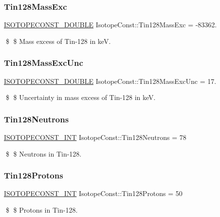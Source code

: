 \subsubsection{\texorpdfstring{Tin128\+Mass\+Exc}{Tin128MassExc}}
{\footnotesize\ttfamily \mbox{\hyperlink{group___isotope_const-_macros_ga8f45a7272ce02c0b4c65c44636ed719a}{I\+S\+O\+T\+O\+P\+E\+C\+O\+N\+S\+T\+\_\+\+D\+O\+U\+B\+LE}} Isotope\+Const\+::\+Tin128\+Mass\+Exc = -\/83362.}

\$ \$ Mass excess of Tin-\/128 in keV. \mbox{\label{group___isotope_const-_tin-_sn128_gaa0fb758383b0a115f6d10980572f7d77}} 
\subsubsection{\texorpdfstring{Tin128\+Mass\+Exc\+Unc}{Tin128MassExcUnc}}
{\footnotesize\ttfamily \mbox{\hyperlink{group___isotope_const-_macros_ga8f45a7272ce02c0b4c65c44636ed719a}{I\+S\+O\+T\+O\+P\+E\+C\+O\+N\+S\+T\+\_\+\+D\+O\+U\+B\+LE}} Isotope\+Const\+::\+Tin128\+Mass\+Exc\+Unc = 17.}

\$ \$ Uncertainty in mass excess of Tin-\/128 in keV. \mbox{\label{group___isotope_const-_tin-_sn128_ga45ab84ba12ddea896569eb0dc6f51d60}} 
\subsubsection{\texorpdfstring{Tin128\+Neutrons}{Tin128Neutrons}}
{\footnotesize\ttfamily \mbox{\hyperlink{group___isotope_const-_macros_ga5f18360b3e99483a35c32d789e62621c}{I\+S\+O\+T\+O\+P\+E\+C\+O\+N\+S\+T\+\_\+\+I\+NT}} Isotope\+Const\+::\+Tin128\+Neutrons = 78}

\$ \$ Neutrons in Tin-\/128. \mbox{\label{group___isotope_const-_tin-_sn128_ga9d2354b730fa1f3f5b72179d9d0147a8}} 
\subsubsection{\texorpdfstring{Tin128\+Protons}{Tin128Protons}}
{\footnotesize\ttfamily \mbox{\hyperlink{group___isotope_const-_macros_ga5f18360b3e99483a35c32d789e62621c}{I\+S\+O\+T\+O\+P\+E\+C\+O\+N\+S\+T\+\_\+\+I\+NT}} Isotope\+Const\+::\+Tin128\+Protons = 50}

\$ \$ Protons in Tin-\/128. 